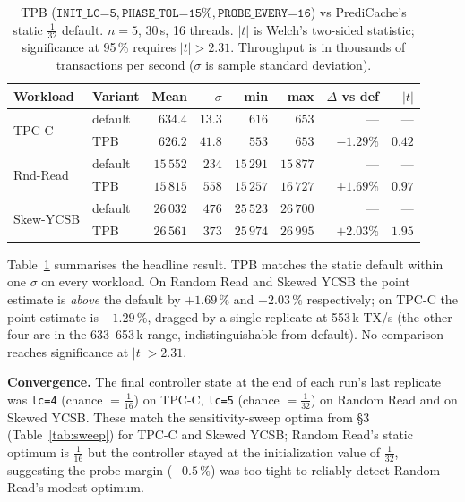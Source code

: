 \documentclass[10pt,twocolumn]{article}
\begin{document}
\begin{table}[h]
\centering\small
\caption{TPB ($\texttt{INIT\_LC=5}, \texttt{PHASE\_TOL=15\%}, \texttt{PROBE\_EVERY=16}$)
  vs PrediCache's static $\tfrac{1}{32}$ default.  $n\!=\!5$, 30\,s, 16 threads.
  $|t|$ is Welch's two-sided statistic; significance at 95\,\% requires
  $|t|>2.31$.  Throughput is in thousands of transactions per second
  ($\sigma$ is sample standard deviation).}
\label{tab:tpb}
\setlength{\tabcolsep}{4pt}
\begin{tabular}{l l rrrr rr}
\toprule
Workload & Variant & Mean & $\sigma$ & min & max & $\Delta$ vs def & $|t|$ \\
\midrule
\multirow{2}{*}{TPC-C} & default & $634.4$ & $13.3$ & $616$ & $653$ & --- & --- \\
                      & TPB     & $626.2$ & $41.8$ & $553$ & $653$ & $-1.29\%$ & $0.42$ \\
\midrule
\multirow{2}{*}{Rnd-Read}  & default & $15\,552$ & $234$ & $15\,291$ & $15\,877$ & --- & --- \\
                          & TPB     & $15\,815$ & $558$ & $15\,257$ & $16\,727$ & $+1.69\%$ & $0.97$ \\
\midrule
\multirow{2}{*}{Skew-YCSB} & default & $26\,032$ & $476$ & $25\,523$ & $26\,700$ & --- & --- \\
                          & TPB     & $26\,561$ & $373$ & $25\,974$ & $26\,995$ & $+2.03\%$ & $1.95$ \\
\bottomrule
\end{tabular}
\end{table}

Table~\ref{tab:tpb} summarises the headline result.  TPB matches the
static default within one $\sigma$ on every workload.  On Random Read
and Skewed YCSB the point estimate is \emph{above} the default by
$+1.69\,\%$ and $+2.03\,\%$ respectively; on TPC-C the point estimate
is $-1.29\,\%$, dragged by a single replicate at 553\,k TX/s (the other
four are in the 633--653\,k range, indistinguishable from default).
No comparison reaches significance at $|t|>2.31$.

\textbf{Convergence.}  The final controller state at the end of each
run's last replicate was \texttt{lc=4} (chance $= \tfrac{1}{16}$) on
TPC-C, \texttt{lc=5} (chance $= \tfrac{1}{32}$) on Random Read and on
Skewed YCSB.  These match the sensitivity-sweep optima from \S3
(Table~\ref{tab:sweep}) for TPC-C and Skewed YCSB; Random Read's static
optimum is $\tfrac{1}{16}$ but the controller stayed at the
initialization value of $\tfrac{1}{32}$, suggesting the probe margin
($+0.5\,\%$) was too tight to reliably detect Random Read's modest
optimum.
\end{document}
